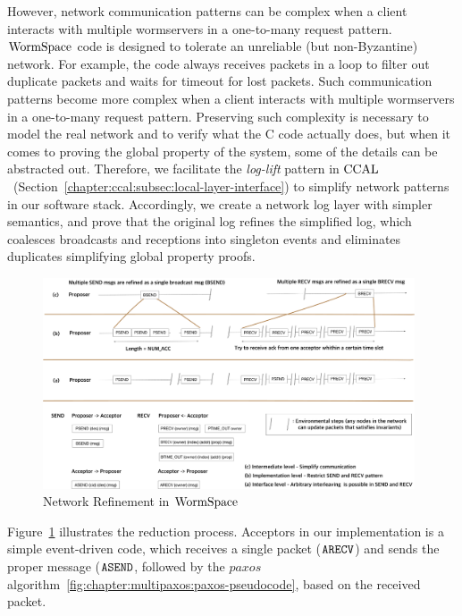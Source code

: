 However, network communication patterns can be complex when a client interacts with multiple wormservers in a one-to-many request pattern.
$\mathrm{WormSpace}$ code is designed to tolerate an unreliable (but non-Byzantine) network. 
For example, the code always receives packets in a loop to filter out duplicate packets and waits for timeout for lost packets.
Such communication patterns become more complex when a client interacts with multiple wormservers in a one-to-many request pattern.
Preserving such complexity is necessary to model the real network and to verify what the C code actually does,
but when it comes to proving the global property of the system, some of the details can be abstracted out.
Therefore, we facilitate the  \textit{log-lift} pattern in $\mathrm{CCAL}$~(Section~\ref{chapter:ccal:subsec:local-layer-interface}) 
to simplify network patterns in our software stack. 
Accordingly, we create a network log layer with simpler semantics, and prove that the original log refines the simplified log, 
which coalesces broadcasts and receptions into singleton events and eliminates duplicates simplifying global property proofs.
\begin{figure}
\begin{center}
\includegraphics[width=0.98\textwidth]{figs/multipaxos/wormspace_network_refine}
\end{center}
\caption{Network Refinement in $\mathrm{WormSpace}$}
\label{fig:chapter:multipaxos:network-refinement}
\end{figure}
Figure~\ref{fig:chapter:multipaxos:network-refinement} illustrates the reduction process.
Acceptors in our implementation is a simple event-driven code, which receives a single packet (${\mathrm{\texttt{ARECV}}}$) and 
sends the proper message (${\mathrm{\texttt{ASEND}}}$, followed by the $paxos$ algorithm~\ref{fig:chapter:multipaxos:paxos-pseudocode}, 
based on the received packet.
